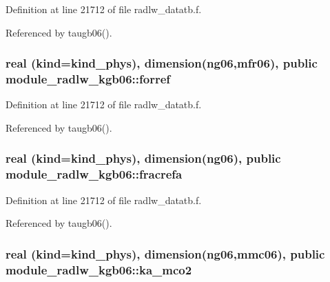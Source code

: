 Definition at line 21712 of file radlw\+\_\+datatb.\+f.



Referenced by taugb06().

\subsubsection[{\texorpdfstring{forref}{forref}}]{\setlength{\rightskip}{0pt plus 5cm}real (kind=kind\+\_\+phys), dimension(ng06,{\bf mfr06}), public module\+\_\+radlw\+\_\+kgb06\+::forref}\hypertarget{namespacemodule__radlw__kgb06_a6a0467b666bc75f90ae58fa4f58f07f0}{}\label{namespacemodule__radlw__kgb06_a6a0467b666bc75f90ae58fa4f58f07f0}


Definition at line 21712 of file radlw\+\_\+datatb.\+f.



Referenced by taugb06().

\subsubsection[{\texorpdfstring{fracrefa}{fracrefa}}]{\setlength{\rightskip}{0pt plus 5cm}real (kind=kind\+\_\+phys), dimension(ng06), public module\+\_\+radlw\+\_\+kgb06\+::fracrefa}\hypertarget{namespacemodule__radlw__kgb06_a1354ecbc5f07cd763847333e680c686a}{}\label{namespacemodule__radlw__kgb06_a1354ecbc5f07cd763847333e680c686a}


Definition at line 21712 of file radlw\+\_\+datatb.\+f.



Referenced by taugb06().

\subsubsection[{\texorpdfstring{ka\+\_\+mco2}{ka_mco2}}]{\setlength{\rightskip}{0pt plus 5cm}real (kind=kind\+\_\+phys), dimension(ng06,{\bf mmc06}), public module\+\_\+radlw\+\_\+kgb06\+::ka\+\_\+mco2}\hypertarget{namespacemodule__radlw__kgb06_adb5dab732383b82e89f1048ab5150c23}{}\label{namespacemodule__radlw__kgb06_adb5dab732383b82e89f1048ab5150c23}


